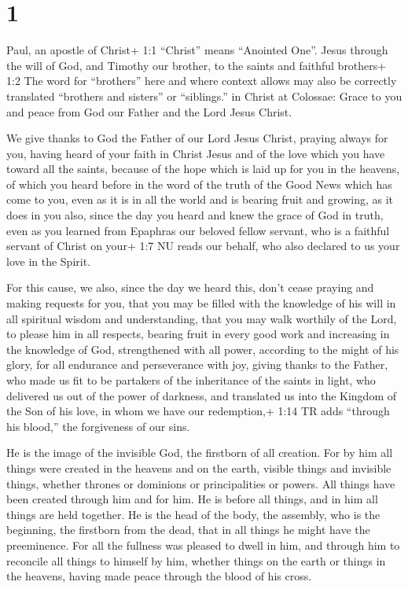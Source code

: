 \hypertarget{section}{%
\section{1}\label{section}}

 Paul, an apostle of Christ+ 1:1 ``Christ'' means ``Anointed
One''. Jesus through the will of God, and Timothy our brother,
 to the saints and faithful brothers+ 1:2 The word for
``brothers'' here and where context allows may also be correctly
translated ``brothers and sisters'' or ``siblings.'' in Christ at
Colossae: Grace to you and peace from God our Father and the Lord Jesus
Christ.

 We give thanks to God the Father of our Lord Jesus Christ,
praying always for you,  having heard of your faith in
Christ Jesus and of the love which you have toward all the saints,
 because of the hope which is laid up for you in the
heavens, of which you heard before in the word of the truth of the Good
News  which has come to you, even as it is in all the world
and is bearing fruit and growing, as it does in you also, since the day
you heard and knew the grace of God in truth,  even as you
learned from Epaphras our beloved fellow servant, who is a faithful
servant of Christ on your+ 1:7 NU reads our behalf,  who
also declared to us your love in the Spirit.

 For this cause, we also, since the day we heard this, don't
cease praying and making requests for you, that you may be filled with
the knowledge of his will in all spiritual wisdom and understanding,
 that you may walk worthily of the Lord, to please him in
all respects, bearing fruit in every good work and increasing in the
knowledge of God,  strengthened with all power, according
to the might of his glory, for all endurance and perseverance with joy,
 giving thanks to the Father, who made us fit to be
partakers of the inheritance of the saints in light,  who
delivered us out of the power of darkness, and translated us into the
Kingdom of the Son of his love,  in whom we have our
redemption,+ 1:14 TR adds ``through his blood,'' the forgiveness of our
sins.

 He is the image of the invisible God, the firstborn of all
creation.  For by him all things were created in the
heavens and on the earth, visible things and invisible things, whether
thrones or dominions or principalities or powers. All things have been
created through him and for him.  He is before all things,
and in him all things are held together.  He is the head of
the body, the assembly, who is the beginning, the firstborn from the
dead, that in all things he might have the preeminence. 
For all the fullness was pleased to dwell in him,  and
through him to reconcile all things to himself by him, whether things on
the earth or things in the heavens, having made peace through the blood
of his cross.

